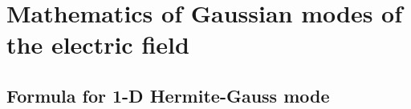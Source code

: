 \chapter{Mathematics of Gaussian modes of the electric field}

\section{Formula for 1-D Hermite-Gauss mode}
\label{ap:HGmode}

